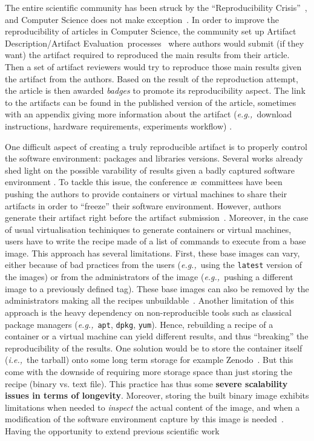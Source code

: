 \documentclass[sigconf,natbib=false]{acmart}
\newcommand{\ie}{\emph{i.e.,}}
\newcommand{\eg}{\emph{e.g.,}}
\newcommand{\ad}{Artifact Description}
\newcommand{\aeval}{Artifact Evaluation}
\newcommand{\adae}{\ad/\aeval}
\newcommand{\todo}[1]{{\color{red}{TODO: #1}}}
\begin{document}
The entire scientific community has been struck by the ``Reproducibility Crisis''~\cite{baker500ScientistsLift2016}, and Computer Science does not make exception~\cite{collberg_repeatability_2015}.
In order to improve the reproducibility of articles in Computer Science, the community set up \adae\ processes~\cite{kidwell2016badges} where authors would submit (if they want) the artifact required to reproduced the main results from their article.
Then a set of artifact reviewers would try to reproduce those main results given the artifact from the authors.
Based on the result of the reproduction attempt, the article is then awarded \emph{badges} to promote its reproducibility aspect.
The link to the artifacts can be found in the published version of the article, sometimes with an appendix giving more information about the artifact (\eg\ download instructions, hardware requirements, experiments workflow) \cite{paperswithcode, kang2023papers, hong2013software}.

One difficult aspect of creating a truly reproducible artifact is to properly control the software environment: packages and libraries versions.
Several works already shed light on the possible varability of results given a badly captured software environment \cite{mytkowicz_producing_nodate} \todo{more}.
To tackle this issue, the conference \ae\ committees have been pushing the authors to provide containers or virtual machines to share their artifacts in order to ``freeze'' their software environment.
However, authors generate their artifact right before the artifact submission~\cite{guilloteau2024longevity, guilloteau2024frustrations}.
Moreover, in the case of usual virtualisation techiniques to generate containers or virtual machines, users have to write the recipe made of a list of commands to execute from a base image.
This approach has several limitations.
First, these base images can vary, either because of bad practices from the users (\eg\ using the \texttt{latest} version of the images) or from the administrators of the image (\eg\ pushing a different image to a previously defined tag).
These base images can also be removed by the administrators making all the recipes unbuildable~\cite{nvidia_cuda_lifetime}.
Another limitation of this approach is the heavy dependency on non-reproducible tools such as classical package managers (\eg\ \texttt{apt}, \texttt{dpkg}, \texttt{yum}).
Hence, rebuilding a recipe of a container or a virtual machine can yield different results, and thus ``breaking'' the reproducibility of the results.
One solution would be to store the container itself (\ie\ the tarball) onto some long term storage for example Zenodo~\cite{zenodo}.
But this come with the downside of requiring more storage space than just storing the recipe (binary vs. text file).
This practice has thus some \textbf{severe scalability issues in terms of longevity}.
Moreover, storing the built binary image exhibits limitations when needed to \emph{inspect} the actual content of the image, and when a modification of the software environment capture by this image is needed~\cite{mercier2018considering}.
Having the opportunity to extend previous scientific work \todo{...}
\end{document}
